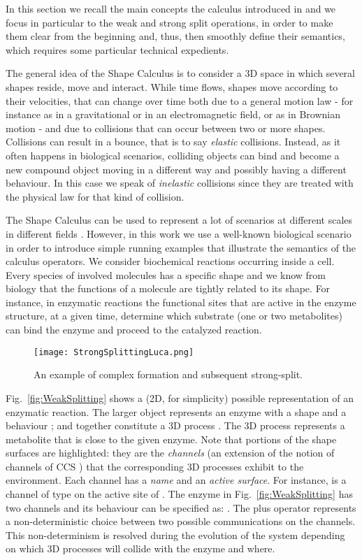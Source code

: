 \documentclass[11pt]{article}
\begin{document}
In this section we recall the main concepts the calculus introduced in \cite{Bartocci2010} and we focus in particular to the weak and strong split operations, in order to make them clear from the beginning and, thus, then smoothly define their semantics, which requires some particular technical expedients.

The general idea of the Shape Calculus is to consider a 3D space in which several shapes reside, move and interact. While time flows, shapes move according to their velocities, that can change over time both due to a general motion law - for instance as in a gravitational or in an electromagnetic field, or as in Brownian motion - and due to collisions that can occur between two or more shapes. Collisions can result in a bounce, that is to say {\em elastic} collisions. Instead, as it often happens in biological scenarios, colliding objects can bind and become a new compound object moving in a different way and possibly having a different behaviour. In this case we speak of {\em inelastic} collisions since they are treated with the physical law for that kind of collision.

The Shape Calculus can be used to represent a lot of scenarios at different scales in different fields \cite{Bartocci2010}. However, in this work we use a well-known biological scenario in order to introduce simple running examples that illustrate the semantics of the calculus operators. We consider biochemical reactions occurring inside a cell. Every species of involved molecules has a specific shape and we know from biology that the functions of a molecule are tightly related to its shape. For instance, in enzymatic reactions the functional sites that are active in the enzyme structure, at a given time, determine which substrate (one or two metabolites) can bind the enzyme and proceed to the catalyzed reaction.

\begin{figure}[t]
\begin{center}
\texttt{[image: StrongSplittingLuca.png]}
\end{center}
\caption{An example of complex formation and subsequent strong-split.}
\label{fig:StrongSplitting}
\end{figure}

Fig.~\ref{fig:WeakSplitting} shows a (2D, for simplicity) possible representation of an enzymatic reaction. The larger object represents an enzyme with a shape  and a behaviour ;  and  together constitute a 3D process . The 3D process  represents a metabolite that is close to the given enzyme. Note that portions of the shape surfaces are highlighted: they are the {\em channels} (an extension of the notion of channels of CCS \cite{Milner1989}) that the corresponding 3D processes exhibit to the environment. Each channel has a {\em name} and an {\em active surface}. For instance,  is a channel of type  on the active site  of . The enzyme in Fig.~\ref{fig:WeakSplitting} has two channels and its behaviour can be specified as: . The plus operator represents a non-deterministic choice between two possible communications on the channels. This non-determinism is resolved during the evolution of the system depending on which 3D processes will collide with the enzyme and where.
\end{document}
